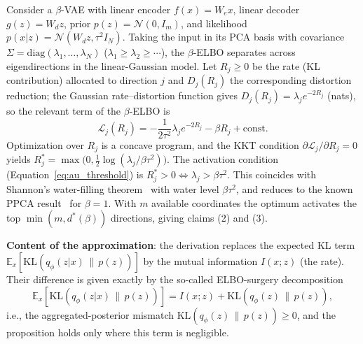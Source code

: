 \documentclass[make,article,submit,pdftex,moreauthors]{Definitions/mdpi}
\newcommand{\dstar}{d^{*}(\beta)}
\begin{document}
Consider a $\beta$-VAE with linear encoder $f(x) = W_e x$, linear decoder
$g(z) = W_d z$, prior $p(z) = \mathcal{N}(0, I_m)$, and likelihood
$p(x|z) = \mathcal{N}(W_d z, \tau^2 I_N)$.
Taking the input in its PCA basis with covariance
$\Sigma = \mathrm{diag}(\lambda_1, \ldots, \lambda_N)$
($\lambda_1 \geq \lambda_2 \geq \cdots$), the $\beta$-ELBO separates across
eigendirections in the linear-Gaussian model.
Let $R_j \geq 0$ be the rate (KL contribution) allocated to direction $j$
and $D_j(R_j)$ the corresponding distortion reduction; the Gaussian
rate--distortion function gives $D_j(R_j) = \lambda_j e^{-2R_j}$ (nats), so
the relevant term of the $\beta$-ELBO is
\begin{equation}
  \mathcal{L}_j(R_j) = -\frac{1}{2\tau^2}\lambda_j e^{-2R_j} - \beta R_j + \text{const.}
\end{equation}
Optimization over $R_j$ is a concave program, and the KKT condition
$\partial \mathcal{L}_j / \partial R_j = 0$ yields
$R_j^* = \max\bigl(0, \tfrac{1}{2}\log(\lambda_j / \beta\tau^2)\bigr)$.
The activation condition (Equation~\eqref{eq:au_threshold}) is
$R_j^* > 0 \iff \lambda_j > \beta\tau^2$.
This coincides with Shannon's water-filling theorem~\cite{cover2006elements}
with water level $\beta\tau^2$, and reduces to the known PPCA
result~\cite{tippingbishop1999ppca} for $\beta = 1$.
With $m$ available coordinates the optimum activates the top
$\min(m, \dstar)$ directions, giving claims (2) and (3).

\textbf{Content of the approximation}: the derivation replaces the expected
KL term $\mathbb{E}_x[\mathrm{KL}(q_\phi(z|x)\,\|\,p(z))]$ by the mutual
information $I(x; z)$ (the rate).
Their difference is given exactly by the so-called ELBO-surgery
decomposition~\cite{hoffman2016elbo}
\begin{equation}
  \mathbb{E}_x[\mathrm{KL}(q_\phi(z|x)\,\|\,p(z))]
  = I(x; z) + \mathrm{KL}(q_\phi(z)\,\|\,p(z)),
  \label{eq:elbo_surgery}
\end{equation}
i.e., the aggregated-posterior mismatch
$\mathrm{KL}(q_\phi(z)\,\|\,p(z)) \geq 0$, and the proposition holds only
where this term is negligible.
\end{document}

